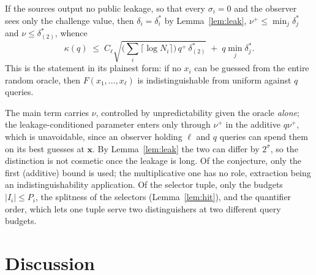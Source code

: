\documentclass{conjura-conjecture}
\newcommand{\vx}{\mathbf{x}}
\newcommand{\vl}{\boldsymbol{\ell}}
\begin{document}
\begin{corollary}\label{cor:noleak}
If the sources output no public leakage, so that every $\sigma_i = 0$ and
the observer sees only the challenge value, then
$\delta_i = \delta^{\ast}_i$ by Lemma~\ref{lem:leak},
$\nu^{+} \le \min_j\delta^{\ast}_j$ and $\nu \le \delta^{\ast}_{(2)}$,
whence
\[
  \kappa(q) \;\le\; C_\ell
  \sqrt{\textstyle\bigl(\sum_i \lceil\log N_i\rceil\bigr)\,q^{+}\,
  \delta^{\ast}_{(2)}} \;+\; q\min_j \delta^{\ast}_j .
\]
This is the statement in its plainest form: if no $x_i$ can be guessed
from the entire random oracle, then $F(x_1,\dots,x_\ell)$ is
indistinguishable from uniform against $q$ queries.
\end{corollary}

\begin{remark}\label{rem:uses}
The main term carries $\nu$, controlled by unpredictability given the
oracle \emph{alone}; the leakage-conditioned parameter enters only through
$\nu^{+}$ in the additive $q\nu^{+}$, which is unavoidable, since an
observer holding $\vl$ and $q$ queries can spend them on its best guesses
at $\vx$. By Lemma~\ref{lem:leak} the two can differ by $2^{\sigma}$, so
the distinction is not cosmetic once the leakage is long. Of the
conjecture, only the first (additive) bound is used; the multiplicative
one has no role, extraction being an indistinguishability application. Of
the selector tuple, only the budgets $|I_i| \le P_i$, the splitness of the
selectors (Lemma~\ref{lem:hit}), and the quantifier order, which lets one
tuple serve two distinguishers at two different query budgets.
\end{remark}

\section{Discussion}\label{sec:discussion}
\end{document}
